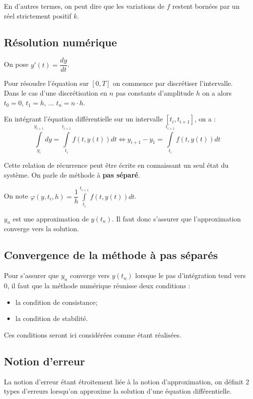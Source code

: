 \documentclass[10pt]{article}
\begin{document}
En d'autres termes, on peut dire que les variations de $f$ restent bornées par un réel strictement positif $k$.

\subsection{Résolution numérique}
On pose $y'(t)=\dfrac{dy}{dt}$.

Pour résoudre l'équation sur $[0,T]$ on commence par discrétiser l'intervalle. Dans le cas d'une discrétisation en $n$ pas constants d'amplitude $h$ on a alors $t_0 = 0$, $t_1=h$, ... $t_n=n\cdot h$.

En intégrant l'équation différentielle sur un intervalle $[t_i, t_{i+1}]$, on a : 
$$
\int\limits_{y_i}^{y_{i+1}} dy = \int\limits_{t_i}^{t_{i+1}} f(t,y(t)) dt 
\Longleftrightarrow 
y_{i+1} - y_1 = \int\limits_{t_i}^{t_{i+1}} f(t,y(t)) dt 
$$

Cette relation de récurrence peut être écrite en connaissant un seul état du système. On parle de méthode à \textbf{pas séparé}.

On note $\varphi (y,t_i,h)= \dfrac{1}{h} \int\limits_{t_i}^{t_{i+1}} f(t,y(t)) dt $.

$y_n$ est une approximation de $y(t_n)$. Il faut donc s'assurer que l'approximation converge vers la solution. 

\subsection{Convergence de la méthode à pas séparés}

Pour s'assurer que $y_n$ converge vers $y(t_n)$ lorsque le pas d'intégration tend vers 0, il faut que la méthode numérique réunisse deux conditions :
\begin{itemize}
\item la condition de consistance;
\item la condition de stabilité. 
\end{itemize}

Ces conditions seront ici considérées comme étant réalisées.

\subsection{Notion d'erreur}

La notion d'erreur étant étroitement liée à la notion d'approximation, on définit 2 types d'erreurs lorsqu'on approxime la solution d'une équation différentielle.
\end{document}

